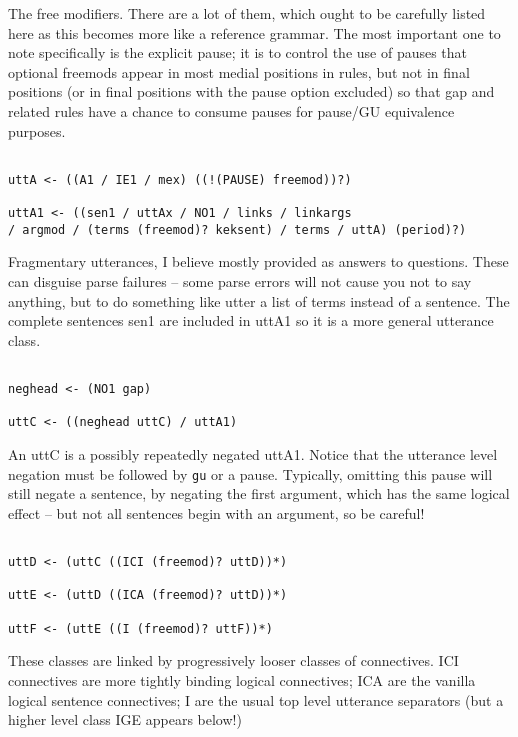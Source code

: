 \documentclass[12pt]{article}
\begin{document}
The free modifiers.   There are a lot of them, which ought to be carefully listed here as this becomes more like a reference
grammar.  The most important one to note specifically is the explicit pause; it is to control the use of pauses that optional freemods
appear in most medial positions in rules, but not in final positions (or in final positions with the pause option excluded) so that
gap and related rules have a chance to consume pauses for pause/GU equivalence purposes.

\begin{verbatim}

uttA <- ((A1 / IE1 / mex) ((!(PAUSE) freemod))?)

uttA1 <- ((sen1 / uttAx / NO1 / links / linkargs 
/ argmod / (terms (freemod)? keksent) / terms / uttA) (period)?)

\end{verbatim}

Fragmentary utterances, I believe mostly provided as answers to questions.   These can disguise parse failures -- some parse errors will not cause you not to say anything, but to do something like utter a list of terms instead of a sentence.  The complete sentences
sen1 are included in uttA1 so it is a more general utterance class.

\begin{verbatim}

neghead <- (NO1 gap)

uttC <- ((neghead uttC) / uttA1)

\end{verbatim}

An uttC is a possibly repeatedly negated uttA1. Notice that the utterance level negation must be followed
by {\tt gu} or a pause.  Typically, omitting this pause will still negate a sentence, by negating the first argument, which
has the same logical effect -- but not all sentences begin with an argument, so be careful!

\begin{verbatim}

uttD <- (uttC ((ICI (freemod)? uttD))*)

uttE <- (uttD ((ICA (freemod)? uttD))*)

uttF <- (uttE ((I (freemod)? uttF))*)

\end{verbatim}

These classes are linked by progressively looser classes of connectives.   ICI connectives are more tightly binding logical connectives; ICA are the vanilla logical sentence connectives; I are the usual top level utterance separators (but a higher level class IGE appears below!)
\end{document}
